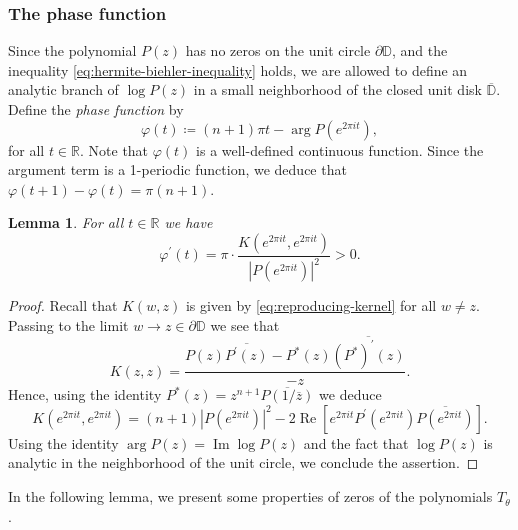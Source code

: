 \documentclass[reqno, a4paper]{amsart}
\def\R{\mathbb{R}}
\newcommand{\dD}{\partial\mathbb{D}}
\theoremstyle{plain}
\newtheorem{lemma}[theorem]{Lemma}
\theoremstyle{definition}
\theoremstyle{remarkstyle}
\numberwithin{equation}{section}
\begin{document}
\subsubsection{The phase function}\label{subsec:phase-function}
Since the polynomial $P(z)$ has no zeros on the unit circle $\partial\mathbb{D}$, and the inequality \eqref{eq:hermite-biehler-inequality} holds, we are allowed to define an analytic branch of $\log P(z)$ in a small neighborhood of the closed unit disk $\overline{\mathbb{D}}$. Define the \emph{phase function} by 
\begin{equation*}
    \varphi(t)\coloneqq  (n+1) \pi t -\operatorname{arg} P(e^{2\pi i  t}),
\end{equation*}
for all $t\in \R$. Note that $\varphi(t)$ is a well-defined continuous function. Since the argument term is a 1-periodic function, we deduce that $\varphi(t+1)-\varphi(t)=\pi (n+1)$.
\begin{lemma}\label{lem:derivative-of-the-phase}
    For all $t\in \R$ we have
    \begin{equation*}
        \varphi^\prime(t)=\pi \cdot \frac{K(e^{2\pi i t}, e^{2\pi i t})}{|P(e^{2\pi i t})|^2}>0.
    \end{equation*}
\end{lemma}

\begin{proof}
Recall that $K(w, z)$ is given by \eqref{eq:reproducing-kernel} for all $w\neq z$. Passing to the limit $w\to z\in \dD$ we see that 
\begin{equation*}
    K(z, z)=\frac{P(z)\overline{P^\prime(z)}-P^\ast(z)\overline{(P^*)^\prime(z)}}{-z}.
\end{equation*}
Hence, using the identity $P^*(z)=z^{n+1}\overline{P(1/\overline{z})}$ we deduce
\begin{equation*}
        K(e^{2\pi i t}, e^{2\pi i t})=(n+1) |P( e^{2\pi i t})|^2-2\operatorname{Re}\left[ e^{2\pi i t} P^\prime( e^{2\pi i t}) \overline{P( e^{2\pi i t})}\right].
\end{equation*}
Using the identity $\arg P(z)=\operatorname{Im} \log P(z)$ and the fact that $\log P(z)$ is analytic in the neighborhood of the unit circle, we conclude the assertion.
\end{proof}

In the following lemma, we present some properties of zeros of the polynomials $T_\theta$. 
\end{document}
